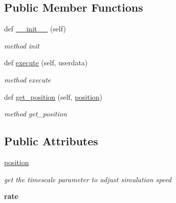 \subsection*{Public Member Functions}
\begin{DoxyCompactItemize}
\item 
def \hyperlink{classbehaviour__controller_1_1Sleep_afb1c72731d2499a8930ee354f37ca7ad}{\+\_\+\+\_\+init\+\_\+\+\_\+} (self)
\begin{DoxyCompactList}\small\item\em method init \end{DoxyCompactList}\item 
def \hyperlink{classbehaviour__controller_1_1Sleep_ae087af71e4af7b6a0967ddcaeecfe346}{execute} (self, userdata)
\begin{DoxyCompactList}\small\item\em method execute \end{DoxyCompactList}\item 
def \hyperlink{classbehaviour__controller_1_1Sleep_aebc97332fedcc5dc6f72c799d002088f}{get\+\_\+position} (self, \hyperlink{classbehaviour__controller_1_1Sleep_afef48330ea2405eb8cbe75e642e7dd59}{position})
\begin{DoxyCompactList}\small\item\em method get\+\_\+position \end{DoxyCompactList}\end{DoxyCompactItemize}
\subsection*{Public Attributes}
\begin{DoxyCompactItemize}
\item 
\mbox{\label{classbehaviour__controller_1_1Sleep_afef48330ea2405eb8cbe75e642e7dd59}} 
\hyperlink{classbehaviour__controller_1_1Sleep_afef48330ea2405eb8cbe75e642e7dd59}{position}
\begin{DoxyCompactList}\small\item\em get the timescale parameter to adjust simulation speed \end{DoxyCompactList}\item 
\mbox{\label{classbehaviour__controller_1_1Sleep_a33c3cb4863818478656fa80ea10a7318}} 
{\bfseries rate}
\end{DoxyCompactItemize}


